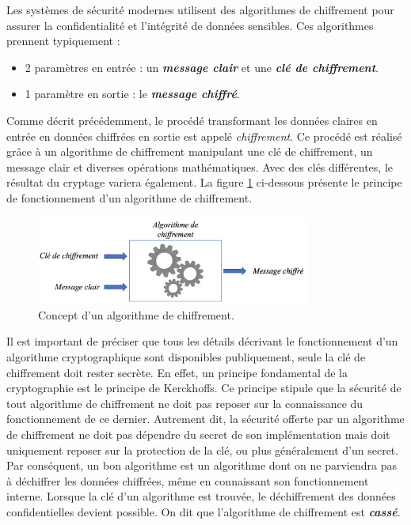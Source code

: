 \documentclass[oneside]{book}
\begin{document}
\hspace{-0.5cm}Les systèmes de sécurité modernes utilisent des algorithmes de chiffrement pour assurer la confidentialité et l'intégrité de données sensibles. Ces algorithmes prennent typiquement : 
\begin{itemize}
\item  2 paramètres en entrée : un \textbf{\textit{message clair}} et une \textbf{\textit{clé de chiffrement}}.
\item 1 paramètre en sortie : le \textbf{\textit{message chiffré}}. \\
\end{itemize}
Comme décrit précédemment, le procédé transformant les données claires en entrée en données chiffrées en sortie est appelé \textit{chiffrement}. Ce procédé est réalisé grâce à un algorithme de chiffrement manipulant une clé de chiffrement, un message clair et diverses opérations mathématiques. Avec des clés différentes, le résultat du cryptage variera également. La figure \ref{fig:chiffrement} ci-dessous présente le principe de fonctionnement d'un algorithme de chiffrement.

\begin{figure}[htbp]
    \centering
    \includegraphics[width=0.8\textwidth]{image/chiffrement}
    \caption{Concept d'un algorithme de chiffrement.}
    \label{fig:chiffrement}
\end{figure}

Il est important de préciser que tous les détails décrivant le fonctionnement d'un algorithme cryptographique sont disponibles publiquement, seule la clé de chiffrement doit rester secrète. En effet, un principe fondamental de la cryptographie est le principe de Kerckhoffs. Ce principe stipule que la sécurité de tout algorithme de chiffrement ne doit pas reposer sur la connaissance du fonctionnement de ce dernier. Autrement dit, la sécurité offerte par un algorithme de chiffrement ne doit pas dépendre du secret de son implémentation mais doit uniquement reposer sur la protection de la clé, ou plus généralement d'un secret. Par conséquent, un bon algorithme est un algorithme dont on ne parviendra pas à déchiffrer les données chiffrées, même en connaissant son fonctionnement interne. Lorsque la clé d'un algorithme est trouvée, le déchiffrement des données confidentielles devient possible. On dit que l'algorithme de chiffrement est \textbf{\textit{cassé}}.
\end{document}
